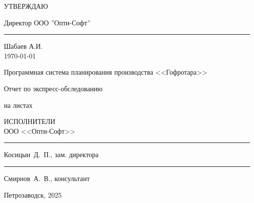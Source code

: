 

\thispagestyle{empty}
%
%
\begin{flushright}
УТВЕРЖДАЮ

\vspace{5mm}
Директор ООО ''Опти-Софт''\\
\vspace{5mm}
\rule{3cm}{0.4pt} Шабаев А.И.\\
\vspace{5mm}
\today
\end{flushright}

\vspace{3cm}
\centerline{\large Программная система планирования производства <<Гофротара>>}


\vspace{5mm}
\centerline{\large \FIRMA}

\vspace{5mm}
\centerline{\large Отчет по экспресс-обследованию}

\vspace{5mm}
\centerline{\ESKDNUM}


\vspace{5mm}
\centerline{на \pageref{LastPage} листах}


\vspace{3cm}
\begin{flushright}
ИСПОЛНИТЕЛИ\\
\vspace{3mm}
ООО <<Опти-Софт>>\\
\vspace{3mm}
\rule{4cm}{0.4pt} Косицын~Д.~П., зам. директора\\
\vspace{3mm}
\rule{4cm}{0.4pt} Смирнов~А.~В., консультант\\
\end{flushright}




\vspace{14mm}
\centerline{Петрозаводск, 2025}



\newpage
